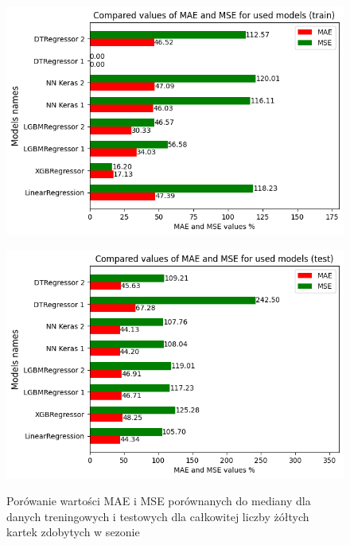 \documentclass{article}
\begin{document}
\begin{figure}[H]
  \centering
  \begin{minipage}[b]{0.5\textwidth}
    \centering
    \includegraphics[width=\textwidth]{all_errors_7.png}
    \label{fig:all_errors_7}
  \end{minipage}%
  \begin{minipage}[b]{0.5\textwidth}
    \centering
    \includegraphics[width=\textwidth]{all_errors_8.png}
    \label{fig:all_errors_8}
  \end{minipage}
  \captionsetup{justification=centering}
  \caption{Porówanie wartości MAE i MSE porównanych do mediany dla danych treningowych i testowych dla całkowitej liczby żółtych kartek zdobytych w sezonie}
  \label{fig:all_errors_2_2}
\end{figure}
\end{document}
